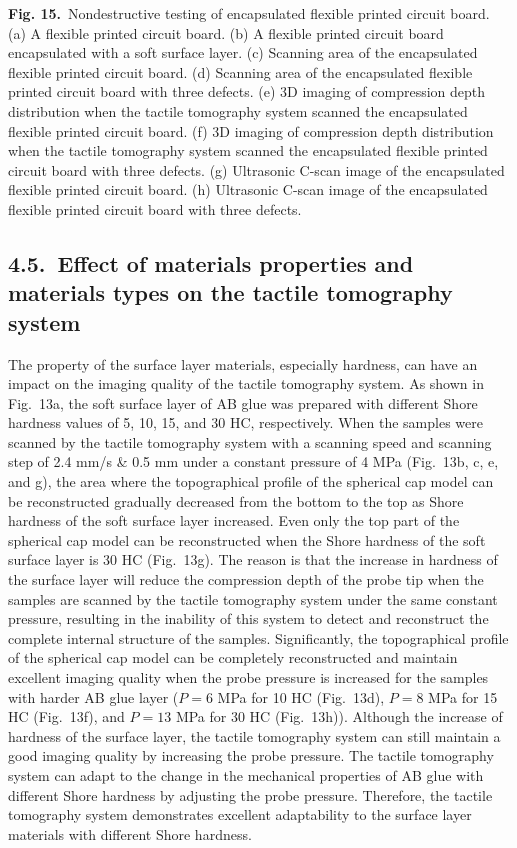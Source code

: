 \documentclass[11pt]{article}
\begin{document}
\vspace{0.4em}

\textbf{Fig. 15.}\ Nondestructive testing of encapsulated flexible
printed circuit board. (a) A flexible printed circuit board.
(b) A flexible printed circuit board encapsulated with a soft
surface layer. (c) Scanning area of the encapsulated flexible
printed circuit board. (d) Scanning area of the encapsulated
flexible printed circuit board with three defects. (e) 3D imaging
of compression depth distribution when the tactile tomography
system scanned the encapsulated flexible printed circuit board.
(f) 3D imaging of compression depth distribution when the tactile
tomography system scanned the encapsulated flexible printed circuit
board with three defects. (g) Ultrasonic C-scan image of the
encapsulated flexible printed circuit board. (h) Ultrasonic C-scan
image of the encapsulated flexible printed circuit board with three
defects.

\vspace{0.8em}

\subsection*{4.5.\ Effect of materials properties and materials types on the tactile tomography system}

The property of the surface layer materials, especially hardness,
can have an impact on the imaging quality of the tactile tomography
system. As shown in Fig.~13a, the soft surface layer of AB glue was
prepared with different Shore hardness values of 5, 10, 15, and 30
HC, respectively. When the samples were scanned by the tactile
tomography system with a scanning speed and scanning step of 2.4
mm/s \& 0.5 mm under a constant pressure of 4 MPa (Fig.~13b, c, e,
and g), the area where the topographical profile of the spherical
cap model can be reconstructed gradually decreased from the bottom
to the top as Shore hardness of the soft surface layer increased.
Even only the top part of the spherical cap model can be
reconstructed when the Shore hardness of the soft surface layer is
30 HC (Fig.~13g). The reason is that the increase in hardness of
the surface layer will reduce the compression depth of the probe
tip when the samples are scanned by the tactile tomography system
under the same constant pressure, resulting in the inability of
this system to detect and reconstruct the complete internal
structure of the samples. Significantly, the topographical profile
of the spherical cap model can be completely reconstructed and
maintain excellent imaging quality when the probe pressure is
increased for the samples with harder AB glue layer ($P = 6$ MPa
for 10 HC (Fig.~13d), $P = 8$ MPa for 15 HC (Fig.~13f), and $P =
13$ MPa for 30 HC (Fig.~13h)). Although the increase of hardness
of the surface layer, the tactile tomography system can still
maintain a good imaging quality by increasing the probe pressure.
The tactile tomography system can adapt to the change in the
mechanical properties of AB glue with different Shore hardness by
adjusting the probe pressure. Therefore, the tactile tomography
system demonstrates excellent adaptability to the surface layer
materials with different Shore hardness.
\end{document}
